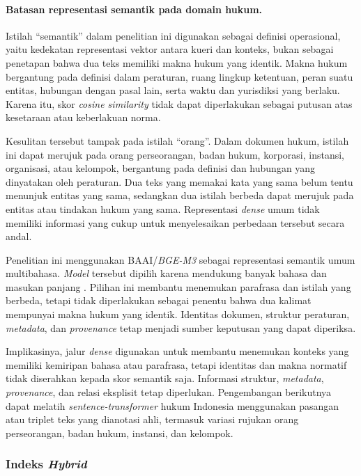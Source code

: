 \paragraph{Batasan representasi semantik pada domain hukum.}
Istilah ``semantik'' dalam penelitian ini digunakan sebagai definisi operasional, yaitu kedekatan
representasi vektor antara kueri dan konteks, bukan sebagai penetapan bahwa dua teks memiliki
makna hukum yang identik. Makna hukum bergantung pada definisi dalam peraturan, ruang lingkup
ketentuan, peran suatu entitas, hubungan dengan pasal lain, serta waktu dan yurisdiksi yang
berlaku. Karena itu, skor \emph{cosine similarity} tidak dapat diperlakukan sebagai putusan atas
kesetaraan atau keberlakuan norma.

Kesulitan tersebut tampak pada istilah ``orang''. Dalam dokumen hukum, istilah ini dapat merujuk
pada orang perseorangan, badan hukum, korporasi, instansi, organisasi, atau kelompok, bergantung
pada definisi dan hubungan yang dinyatakan oleh peraturan. Dua teks yang memakai kata yang sama
belum tentu menunjuk entitas yang sama, sedangkan dua istilah berbeda dapat merujuk pada entitas
atau tindakan hukum yang sama. Representasi \emph{dense} umum tidak memiliki informasi yang cukup
untuk menyelesaikan perbedaan tersebut secara andal.

Penelitian ini menggunakan BAAI/\emph{BGE-M3} sebagai representasi semantik umum multibahasa.
\emph{Model} tersebut dipilih karena mendukung banyak bahasa dan masukan panjang
\parencite{chenM3Embedding2024}. Pilihan ini membantu menemukan parafrasa dan istilah yang berbeda,
tetapi tidak diperlakukan sebagai penentu bahwa dua kalimat mempunyai makna hukum yang identik.
Identitas dokumen, struktur peraturan, \emph{metadata}, dan \emph{provenance} tetap menjadi sumber
keputusan yang dapat diperiksa.

Implikasinya, jalur \emph{dense} digunakan untuk membantu menemukan konteks yang memiliki
kemiripan bahasa atau parafrasa, tetapi identitas dan makna normatif tidak diserahkan kepada
skor semantik saja. Informasi struktur, \emph{metadata}, \emph{provenance}, dan relasi eksplisit
tetap diperlukan. Pengembangan berikutnya dapat melatih \emph{sentence-transformer} hukum
Indonesia menggunakan pasangan atau triplet teks yang dianotasi ahli, termasuk variasi rujukan
orang perseorangan, badan hukum, instansi, dan kelompok.

\subsubsection{Indeks \emph{Hybrid}}
\label{subsubsec:index-hybrid}

